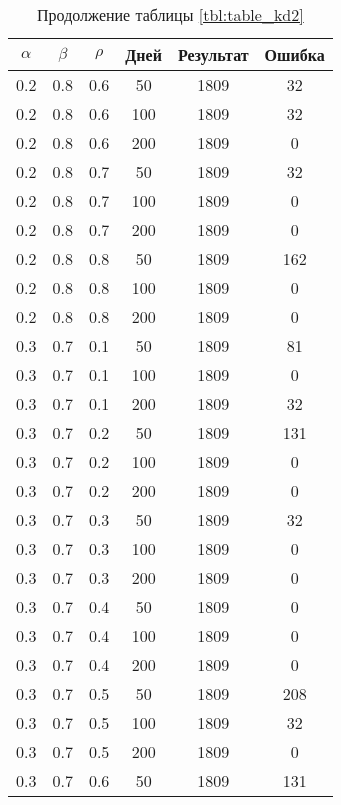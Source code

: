 \begin{table}[h]
	\begin{center}
        \captionsetup{justification=raggedright,singlelinecheck=off}
		\caption*{Продолжение таблицы \ref{tbl:table_kd2}}
		\begin{tabular}{|c|c|c|c|c|c|}
  	\hline
	$\alpha$ & $\beta$ & $\rho$ & Дней & Результат & Ошибка \\\hline
		0.2 &  0.8 &  0.6 &   50 &  1809 &    32 \\
		0.2 &  0.8 &  0.6 &  100 &  1809 &    32 \\
		0.2 &  0.8 &  0.6 &  200 &  1809 &     0 \\
	   \hline
		0.2 &  0.8 &  0.7 &   50 &  1809 &    32 \\
		0.2 &  0.8 &  0.7 &  100 &  1809 &     0 \\
		0.2 &  0.8 &  0.7 &  200 &  1809 &     0 \\
	   \hline
		0.2 &  0.8 &  0.8 &   50 &  1809 &   162 \\
		0.2 &  0.8 &  0.8 &  100 &  1809 &     0 \\
		0.2 &  0.8 &  0.8 &  200 &  1809 &     0 \\
	   \hline
		0.3 &  0.7 &  0.1 &   50 &  1809 &    81 \\
		0.3 &  0.7 &  0.1 &  100 &  1809 &     0 \\
		0.3 &  0.7 &  0.1 &  200 &  1809 &    32 \\
	   \hline
		0.3 &  0.7 &  0.2 &   50 &  1809 &   131 \\
		0.3 &  0.7 &  0.2 &  100 &  1809 &     0 \\
		0.3 &  0.7 &  0.2 &  200 &  1809 &     0 \\
	   \hline
		0.3 &  0.7 &  0.3 &   50 &  1809 &    32 \\
		0.3 &  0.7 &  0.3 &  100 &  1809 &     0 \\
		0.3 &  0.7 &  0.3 &  200 &  1809 &     0 \\
	   \hline
		0.3 &  0.7 &  0.4 &   50 &  1809 &     0 \\
		0.3 &  0.7 &  0.4 &  100 &  1809 &     0 \\
		0.3 &  0.7 &  0.4 &  200 &  1809 &     0 \\
	   \hline
		0.3 &  0.7 &  0.5 &   50 &  1809 &   208 \\
		0.3 &  0.7 &  0.5 &  100 &  1809 &    32 \\
		0.3 &  0.7 &  0.5 &  200 &  1809 &     0 \\
	   \hline
		0.3 &  0.7 &  0.6 &   50 &  1809 &   131 \\

\end{tabular}
\end{center}
\end{table}
